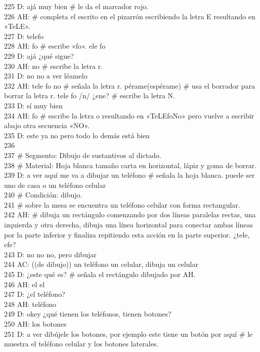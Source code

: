 225 D: ajá muy bien \# le da el marcador rojo.\\
226 AH: \# completa el escrito en el pizarrón escribiendo la letra E resultando en «TeLE».\\
227 D: telefo\\
228 AH: fo \# escribe «fo». ele fo\\
229 D: ajá ¿qué sigue?\\
230 AH: no \# escribe la letra r.\\
231 D: no no a ver léamelo\\
232 AH: tele fo no \# señala la letra r. pérame(espérame) \# usa el borrador para borrar la letra r. tele fo /n/ ¿ene? \# escribe la letra N.\\
233 D: sí muy bien\\
234 AH: fo \# escribe la letra o resultando en «TeLEfoNo» pero vuelve a escribir abajo otra secuencia «NO».\\
235 D: este ya no pero todo lo demás está bien\\
236 \\
237 \# Segmento: Dibujo de sustantivos al dictado.\\
238 \# Material: Hoja blanca tamaño carta en horizontal, lápiz y goma de borrar.\\
239 D: a ver aquí me va a dibujar un teléfono \# señala la hoja blanca. puede ser uno de casa o un teléfono celular\\
240 \# Condición: dibujo.\\
241 \# sobre la mesa se encuentra un teléfono celular con forma rectangular.\\
242 AH: \# dibuja un rectángulo comenzando por dos líneas paralelas rectas, una izquierda y otra derecha, dibuja una línea horizontal para conectar ambas líneas por la parte inferior y finaliza repitiendo esta acción en la parte superior. ¿tele, efe?\\
243 D: no no no, pero dibujar\\
244 AC: ((de dibujo)) un teléfono un celular, dibuja un celular\\
245 D: ¿este qué es? \# señala el rectángulo dibujado por AH.\\
246 AH: el el\\
247 D: ¿el teléfono?\\
248 AH: teléfono\\
249 D: okey ¿qué tienen los teléfonos, tienen botones?\\
250 AH: los botones\\
251 D: a ver dibújele los botones, por ejemplo este tiene un botón por aquí \# le muestra el teléfono celular y los botones laterales.\\
